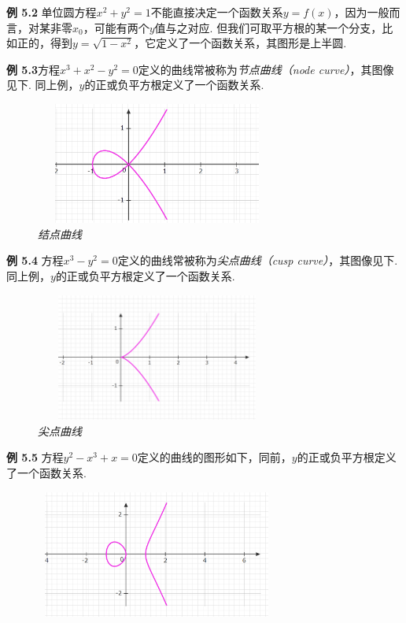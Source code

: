 \documentclass{article}
\begin{document}
\textbf{例 5.2} 单位圆方程$x^{2}+y^{2}=1$不能直接决定一个函数关系$y=f(x)$，因为一般而言，对某非零$x_{0}$，可能有两个$y$值与之对应. 但我们可取平方根的某一个分支，比如正的，得到$y=\sqrt{1-x^{2}}$，它定义了一个函数关系，其图形是上半圆. 


\newpage

\textbf{例 5.3}方程$x^{3}+x^{2}-y^{2}=0$定义的曲线常被称为\textit{节点曲线（node curve）}，其图像见下. 同上例，$y$的正或负平方根定义了一个函数关系. 

\begin{figure}[h]
\includegraphics[height=4cm,width=8cm]{node.PNG}
\centering
\caption{\textit{结点曲线}}
\end{figure}

\textbf{例 5.4} 方程$x^{3}-y^{2}=0$定义的曲线常被称为\textit{尖点曲线（cusp curve）}，其图像见下. 同上例，$y$的正或负平方根定义了一个函数关系. 


\begin{figure}[h]
\includegraphics[height=4.2cm,width=8cm]{cusp.PNG}
\centering
\caption{\textit{尖点曲线}}
\end{figure}


\textbf{例 5.5} 方程$y^{2}-x^{3}+x=0$定义的曲线的图形如下，同前，$y$的正或负平方根定义了一个函数关系. 

\begin{figure}[h]
\includegraphics[height=4.2cm,width=8cm]{ellptic.PNG}
\centering
\end{figure}
\end{document}
